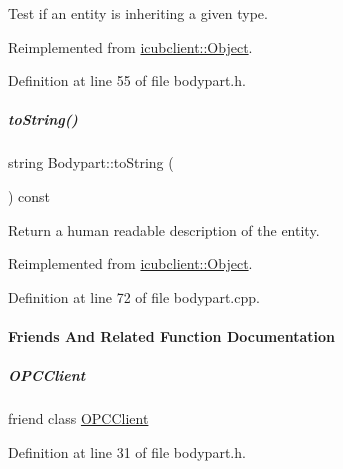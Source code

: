 Test if an entity is inheriting a given type. 



Reimplemented from \hyperlink{group__icubclient__representations_a90398d2c9cc2a42617b50fcbc4533734}{icubclient\+::\+Object}.



Definition at line 55 of file bodypart.\+h.

\mbox{\label{group__icubclient__representations_ac14830acd5adc122c5caeb91947b9ca1}} 
\subparagraph{\texorpdfstring{to\+String()}{toString()}}
{\footnotesize\ttfamily string Bodypart\+::to\+String (\begin{DoxyParamCaption}{ }\end{DoxyParamCaption}) const\hspace{0.3cm}{\ttfamily [virtual]}}



Return a human readable description of the entity. 



Reimplemented from \hyperlink{group__icubclient__representations_aef5180c43e05c572865ad38ff650b930}{icubclient\+::\+Object}.



Definition at line 72 of file bodypart.\+cpp.



\paragraph{Friends And Related Function Documentation}
\mbox{\label{group__icubclient__representations_a80f0caa9925206967111a3d2713874a2}} 
\subparagraph{\texorpdfstring{O\+P\+C\+Client}{OPCClient}}
{\footnotesize\ttfamily friend class \hyperlink{group__icubclient__clients_classicubclient_1_1OPCClient}{O\+P\+C\+Client}\hspace{0.3cm}{\ttfamily [friend]}}



Definition at line 31 of file bodypart.\+h.



